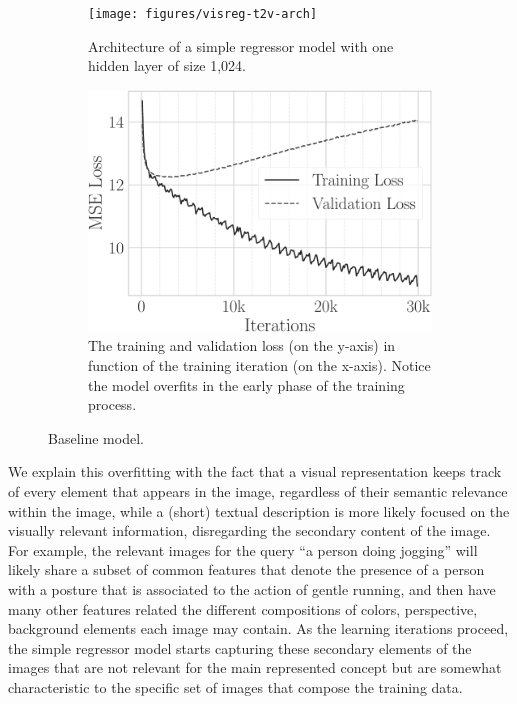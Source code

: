 \begin{figure}
\begin{subfigure}{0.46\textwidth}
\centering
\texttt{[image: figures/visreg-t2v-arch]}
\caption{Architecture of a simple regressor model with one hidden layer of size 1,024.}
\label{fig:t2v:visreg:arch}
\end{subfigure}
\hfill
\begin{subfigure}{0.5\textwidth}
\includegraphics[width=\linewidth]{visreg-loss}
\caption{The training and validation loss (on the y-axis) in function of the training iteration (on the x-axis).
Notice the model overfits in the early phase of the training process.}
\label{fig:t2v:visreg:loss}
\end{subfigure}
\caption{Baseline \visreg{} model.}
\label{fig:t2v:visreg}
\end{figure}

We explain this overfitting with the fact that a visual representation keeps track of every element that appears in the image, regardless of their semantic relevance within the image, while a (short) textual description is more likely focused on the visually relevant information, disregarding the secondary content of the image.
For example, the relevant images for the query ``a person doing jogging'' will likely share a subset of common features that denote the presence of a person with a posture that is associated to the action of gentle running, and then have many other features related the different compositions of colors, perspective, background elements each image may contain.
As the learning iterations proceed, the simple regressor model starts capturing these secondary elements of the images that are not relevant for the main represented concept but are somewhat characteristic to the specific set of images that compose the training data.

